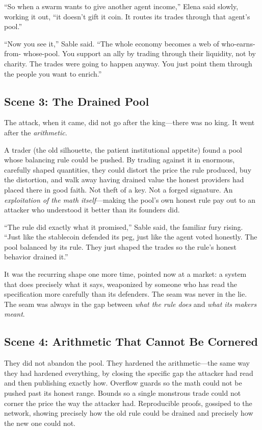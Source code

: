 \documentclass[12pt,letterpaper]{book}
\begin{document}
``So when a swarm wants to give another agent income,'' Elena said slowly, working
it out, ``it doesn't gift it coin. It routes its trades through that agent's pool.''

``Now you see it,'' Sable said. ``The whole economy becomes a web of who-earns-from-
whose-pool. You support an ally by trading through their liquidity, not by charity.
The trades were going to happen anyway. You just point them through the people you
want to enrich.''

\hypertarget{scene-3-the-drained-pool}{%
\subsection{Scene 3: The Drained
Pool}\label{scene-3-the-drained-pool}}

The attack, when it came, did not go after the king---there was no king. It went
after the \emph{arithmetic}.

A trader (the old silhouette, the patient institutional appetite) found a pool whose
balancing rule could be pushed. By trading against it in enormous, carefully
shaped quantities, they could distort the price the rule produced, buy the
distortion, and walk away having drained value the honest providers had placed
there in good faith. Not theft of a key. Not a forged signature. An
\emph{exploitation of the math itself}---making the pool's own honest rule pay out
to an attacker who understood it better than its founders did.

``The rule did exactly what it promised,'' Sable said, the familiar fury rising.
``Just like the stablecoin defended its peg, just like the agent voted honestly.
The pool balanced by its rule. They just shaped the trades so the rule's honest
behavior drained it.''

It was the recurring shape one more time, pointed now at a market: a system that
does precisely what it says, weaponized by someone who has read the specification
more carefully than its defenders. The seam was never in the lie. The seam was
always in the gap between \emph{what the rule does} and \emph{what its makers
meant}.

\hypertarget{scene-4-arithmetic-that-cannot-be-cornered}{%
\subsection{Scene 4: Arithmetic That Cannot Be
Cornered}\label{scene-4-arithmetic-that-cannot-be-cornered}}

They did not abandon the pool. They hardened the arithmetic---the same way they had
hardened everything, by closing the specific gap the attacker had read and then
publishing exactly how. Overflow guards so the math could not be pushed past its
honest range. Bounds so a single monstrous trade could not corner the price the way
the attacker had. Reproducible proofs, gossiped to the network, showing precisely
how the old rule could be drained and precisely how the new one could not.
\end{document}
